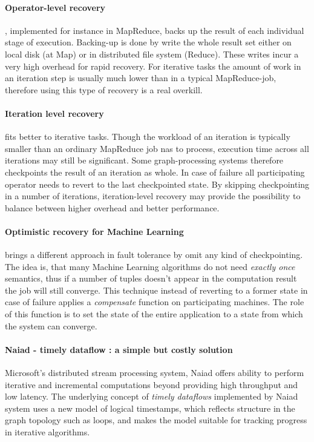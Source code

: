 \paragraph{Operator-level recovery}, implemented for instance in MapReduce\cite{mapreduce}, backs up the result of each individual stage of execution. Backing-up is done by write the whole result set either on local disk (at Map) or in distributed file system (Reduce). These writes incur a very high overhead for rapid recovery. For iterative tasks the amount of work in an iteration step is usually  much lower than in a typical MapReduce-job, therefore using this type of recovery is a real overkill.

\paragraph{Iteration level recovery} fits better to iterative tasks. Though the workload of an iteration is typically smaller than an ordinary MapReduce job nas to process, execution time across all iterations  may still be significant. Some graph-processing systems\cite{distgraphlab}\cite{pregel} therefore checkpoints the result of an iteration as whole. In case of failure all participating operator needs to revert to the last checkpointed state. By skipping checkpointing in a number of iterations, iteration-level recovery may provide the possibility to balance between higher overhead and better performance.

\paragraph{Optimistic recovery for Machine Learning}\cite{allroadsleadtorome} brings a different approach in fault tolerance by omit any kind of checkpointing. The idea is, that many Machine Learning algorithms do not need \textit{exactly once} semantics, thus if a number of tuples doesn't appear in the computation result the job will still converge.  This technique instead of reverting to a former state in case of failure applies a \textit{compensate} function on participating machines. The role of this function is to set the state of the entire application to a state from which the system can converge.

\paragraph{Naiad - timely dataflow : a simple but costly solution}
Microsoft's  distributed stream processing system, Naiad\cite{naiad} offers ability to perform iterative and incremental computations beyond providing high throughput and low latency.
The underlying concept of \textit{timely dataflows} implemented by Naiad system uses a new model of logical timestamps, which reflects structure in the graph topology such as loops, and makes the model suitable  for tracking progress in iterative algorithms. 

